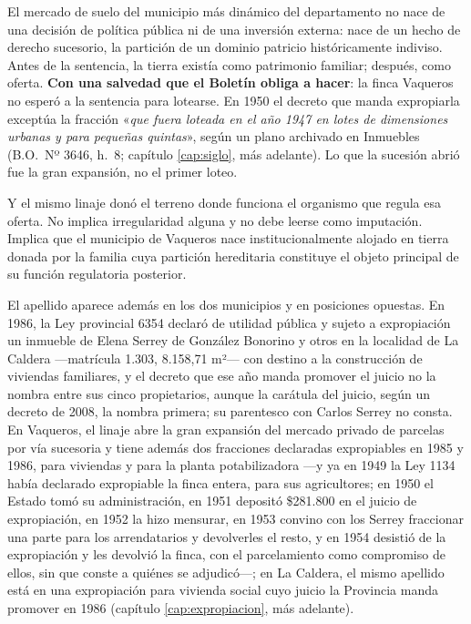 \begin{cautela}
El mercado de suelo del municipio más dinámico del departamento no nace de una decisión de
política pública ni de una inversión externa: nace de un hecho de derecho sucesorio, la
partición de un dominio patricio históricamente indiviso. Antes de la sentencia, la tierra
existía como patrimonio familiar; después, como oferta. \textbf{Con una salvedad que el Boletín
obliga a hacer}: la finca Vaqueros no esperó a la sentencia para lotearse. En 1950
el decreto que manda expropiarla exceptúa la fracción «\textit{que fuera loteada en el año 1947 en
lotes de dimensiones urbanas y para pequeñas quintas}», según un plano archivado en Inmuebles (B.O.\
Nº 3646, h.\ 8; capítulo \ref{cap:siglo}, más adelante). Lo que la sucesión abrió fue la gran expansión, no el
primer loteo.

Y el mismo linaje donó el terreno donde funciona el organismo que regula esa oferta. No
implica irregularidad alguna y no debe leerse como imputación. Implica que el municipio de
Vaqueros nace institucionalmente alojado en tierra donada por la familia cuya partición
hereditaria constituye el objeto principal de su función regulatoria posterior.

El apellido aparece además en los dos municipios y en posiciones opuestas. En 1986, la Ley
provincial 6354 declaró de utilidad pública y sujeto a expropiación un inmueble de Elena Serrey de
González Bonorino y otros en la localidad de La Caldera —matrícula 1.303, 8.158,71 m²— con destino
a la construcción de viviendas familiares, y el decreto que ese año manda promover el juicio no la nombra entre sus cinco propietarios, aunque la carátula del juicio, según un decreto de 2008, la nombra primera; su parentesco con Carlos Serrey no consta. En Vaqueros, el linaje abre la gran expansión del mercado privado de parcelas por vía sucesoria y tiene además dos fracciones declaradas expropiables en 1985 y 1986, para viviendas y para la planta potabilizadora ---y ya en 1949 la Ley 1134 había declarado expropiable la finca entera, para sus agricultores; en 1950 el Estado tomó su administración, en 1951 depositó \$281.800 en el juicio de expropiación, en 1952 la hizo mensurar, en 1953 convino con los Serrey fraccionar una parte para los arrendatarios y devolverles el resto, y en 1954 desistió de la expropiación y les devolvió la finca, con el parcelamiento como compromiso de ellos, sin que conste a quiénes se adjudicó---; en La Caldera, el mismo apellido está en una expropiación para vivienda social cuyo juicio la Provincia manda promover en 1986 (capítulo \ref{cap:expropiacion}, más adelante).
\end{cautela}

